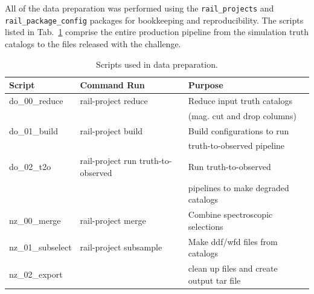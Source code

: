 \documentclass[11pt,twoside,letterpaper,onecolumn,english]{article}
\begin{document}
All of the data preparation was performed using the
\texttt{rail\_projects} and \texttt{rail\_package\_config} packages
for bookkeeping and reproducibility.  The scripts listed in Tab.~\ref{tab:prep_scripts}
comprise the entire production pipeline from the simulation truth catalogs
to the files released with the challenge. 

\begin{table}[ht]
\centering
\caption{\label{tab:prep_scripts}\small Scripts used
  in data preparation.}
\begin{tabular}{lll}
\hline \hline
Script & Command Run & Purpose \\ \hline
  do\_00\_reduce & rail-project reduce & Reduce input truth catalogs \\
  &  & (mag. cut and drop columns) \\ 
do\_01\_build & rail-project build & Build configurations to run \\
  &  & truth-to-observed pipeline \\
do\_02\_t2o & rail-project run truth-to-observed & Run truth-to-observed \\
       &  & pipelines to make degraded catalogs \\
nz\_00\_merge & rail-project merge & Combine spectroscopic selections \\
  nz\_01\_subselect & rail-project subsample & Make ddf/wfd files from catalogs\\
  nz\_02\_export & & clean up files and create output tar file\\
\hline\hline
\end{tabular}
\end{table}


\newpage


\end{document}
